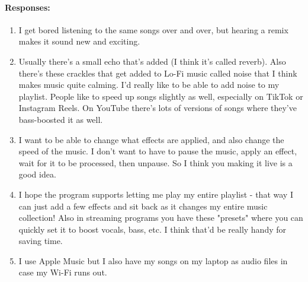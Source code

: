{{\begin{minipage}{15cm}
			\paragraph{Responses:}
			\begin{enumerate}
				\item I get bored listening to the same songs over and over, but hearing a remix makes it sound new and exciting.
				\item Usually there's a small echo that's added (I think it's called reverb). Also there's these crackles that get added to Lo-Fi music called noise that I think makes music quite calming. I'd really like to be able to add noise to my playlist. People like to speed up songs slightly as well, especially on TikTok or Instagram Reels. On YouTube there's lots of versions of songs where they've bass-boosted it as well. 
				\item I want to be able to change what effects are applied, and also change the speed of the music. I don't want to have to pause the music, apply an effect, wait for it to be processed, then unpause. So I think you making it live is a good idea.
				\item I hope the program supports letting me play my entire playlist - that way I can just add a few effects and sit back as it changes my entire music collection! Also in streaming programs you have these "presets" where you can quickly set it to boost vocals, bass, etc. I think that'd be really handy for saving time.
				\item I use Apple Music but I also have my songs on my laptop as audio files in case my Wi-Fi runs out. 
			\end{enumerate}
			\bigskip \bigskip \bigskip
	\end{minipage}}
}

\pagebreak
